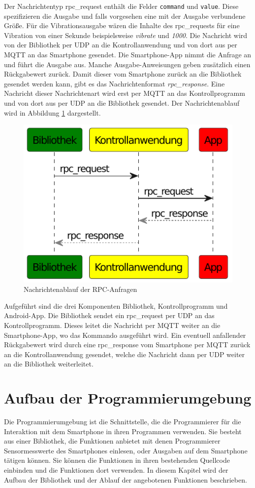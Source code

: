 \documentclass[11pt,a4paper]{report}
\begin{document}
Der Nachrichtentyp rpc\_request enthält die Felder \texttt{command} und \texttt{value}.
Diese spezifizieren die Ausgabe und falls vorgesehen eine mit der Ausgabe verbundene Größe.
Für die Vibrationsausgabe wären die Inhalte des rpc\_requests für eine Vibration von einer Sekunde beispielsweise \textit{vibrate} und \textit{1000}.
Die Nachricht wird von der Bibliothek per UDP an die Kontrollanwendung und von dort aus per MQTT an das Smartphone gesendet.
Die Smartphone-App nimmt die Anfrage an und führt die Ausgabe aus.
Manche Ausgabe-Anweisungen geben zusätzlich einen Rückgabewert zurück.
Damit dieser vom Smartphone zurück an die Bibliothek gesendet werden kann, gibt es das Nachrichtenformat \textit{rpc\_response}.
Eine Nachricht dieser Nachrichtenart wird erst per MQTT an das Kontrollprogramm und von dort aus per UDP an die Bibliothek gesendet.
Der Nachrichtenablauf wird in Abbildung \ref{fig:message_flow_rpc} dargestellt.
\begin{figure}[htbp]
\centering
\includegraphics[width=.6\textwidth]{images/message_flow_rpc.pdf}
\caption{Nachrichtenablauf der RPC-Anfragen}
\label{fig:message_flow_rpc}
\end{figure}
Aufgeführt sind die drei Komponenten Bibliothek, Kontrollprogramm und Android-App.
Die Bibliothek sendet ein rpc\_request per UDP an das Kontrollprogramm.
Dieses leitet die Nachricht per MQTT weiter an die Smartphone-App, wo das Kommando ausgeführt wird.
Ein eventuell anfallender Rückgabewert wird durch eine rpc\_response vom Smartphone per MQTT zurück an die Kontrollanwendung gesendet, welche die Nachricht dann per UDP weiter an die Bibliothek weiterleitet.

\chapter{Aufbau der Programmierumgebung}\label{chap:libs}
Die Programmierumgebung ist die Schnittstelle, die die Programmierer für die Interaktion mit dem Smartphone in ihren Programmen verwenden.
Sie besteht aus einer Bibliothek, die Funktionen anbietet mit denen Programmierer Sensormesswerte des Smartphones einlesen, oder Ausgaben auf dem Smartphone tätigen können.
Sie können die Funktionen in ihren bestehenden Quellcode einbinden und die Funktionen dort verwenden.
In diesem Kapitel wird der Aufbau der Bibliothek und der Ablauf der angebotenen Funktionen beschrieben. 
\end{document}
